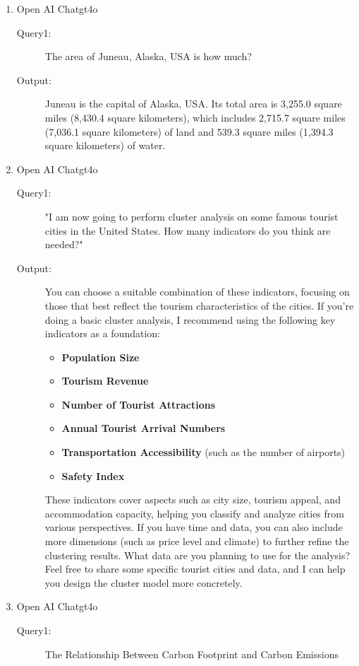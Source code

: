 \documentclass{mcmthesis}
\begin{document}
\begin{enumerate}
\begin{description}
\end{description}
\item Open AI Chatgt4o 
\begin{description}
\item[Query1:] The area of Juneau, Alaska, USA is how much? 
\item[Output:] Juneau is the capital of Alaska, USA. Its total area is 3,255.0 square miles (8,430.4 square kilometers), which includes 2,715.7 square miles (7,036.1 square kilometers) of land and 539.3 square miles (1,394.3 square kilometers) of water.
\end{description}
\item Open AI Chatgt4o 
\begin{description}
\item[Query1:] "I am now going to perform cluster analysis on some famous tourist cities in the United States. How many indicators do you think are needed?" 
\item[Output:] You can choose a suitable combination of these indicators, focusing on those that best reflect the tourism characteristics of the cities. If you're doing a basic cluster analysis, I recommend using the following key indicators as a foundation:
\begin{itemize}
  \item \textbf{Population Size}
  \item \textbf{Tourism Revenue}
  \item \textbf{Number of Tourist Attractions}
  \item \textbf{Annual Tourist Arrival Numbers}
  \item \textbf{Transportation Accessibility} (such as the number of airports)
  \item \textbf{Safety Index}
\end{itemize}
These indicators cover aspects such as city size, tourism appeal, and accommodation capacity, helping you classify and analyze cities from various perspectives. If you have time and data, you can also include more dimensions (such as price level and climate) to further refine the clustering results.
What data are you planning to use for the analysis? Feel free to share some specific tourist cities and data, and I can help you design the cluster model more concretely.
\end{description}
\item Open AI Chatgt4o 
\begin{description}
\item[Query1:] The Relationship Between Carbon Footprint and Carbon Emissions

\end{description}
\end{enumerate}
\end{document}
